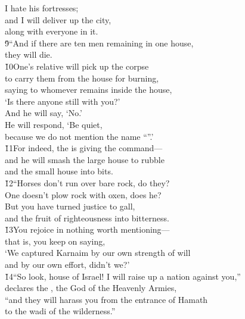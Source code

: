 \begin{poetry}
\poemll    I hate his fortresses; \\
\poeml and I will deliver up the city, \\
\poemll    along with everyone in it. \\
\poeml \v{9}``And if there are ten men remaining in one house, \\
\poemll    they will die. \\
\poeml \v{10}One's relative will pick up the corpse \\
\poemll    to carry them from the house for burning, \\
\poeml saying to whomever remains inside the house, \\
\poemll    `Is there anyone still with you?' \\
\poeml And he will say, `No.' \\
\poemll    He will respond, `Be quiet, \\
\poemlll       because we do not mention the name ``''.' \\
\poeml \v{11}For indeed, the  is giving the command--- \\
\poemll    and he will smash the large house to rubble \\
\poemlll       and the small house into bits. \\
\poeml \v{12}``Horses don't run over bare rock, do they? \\
\poemll    One doesn't plow rock with oxen, does he? \\
\poeml But you have turned justice to gall, \\
\poemll    and the fruit of righteousness into bitterness. \\
\poeml \v{13}You rejoice in nothing worth mentioning--- \\
\poemll    that is, you keep on saying, \\
\poeml `We captured Karnaim by our own strength of will \\
\poemll    and by our own effort, didn't we?' \\
\poeml \v{14}``So look, house of Israel! I will raise up a nation against you,'' \\
\poemll    declares the , the God of the Heavenly Armies, \\
\poeml ``and they will harass you from the entrance of Hamath \\
\poemll    to the wadi of the wilderness.''
\end{poetry}

